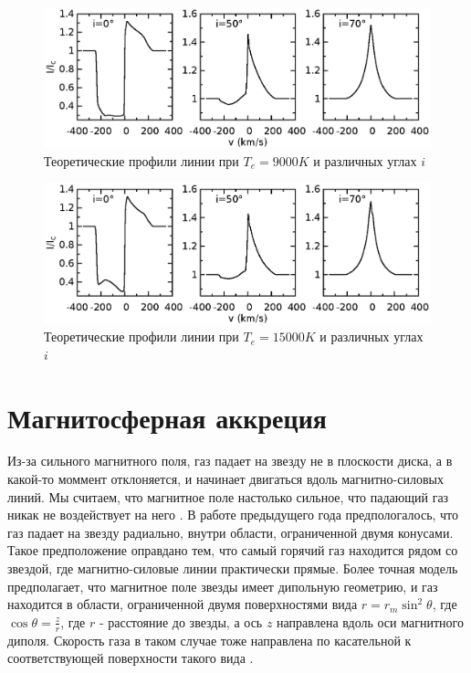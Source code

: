 \documentclass{article}
\begin{document}
\begin{figure} [h]
    \centering
    \includegraphics[width=1\textwidth]{prof}
    \caption{Теоретические профили линии при $T_e=9000K$ и различных углах $i$}
\end{figure}

\begin{figure} [h]
    \centering
    \includegraphics[width=1\textwidth]{prof1}
    \caption{Теоретические профили линии при $T_e=15000K$ и различных углах $i$}
\end{figure}

\section{Магнитосферная аккреция}

Из-за сильного магнитного поля, газ падает на звезду не в плоскости диска, а в какой-то моммент отклоняется, и начинает двигаться вдоль магнитно-силовых линий. Мы считаем, что магнитное поле настолько сильное, что падающий газ никак не воздействует на него \cite{hartman94}. В работе предыдущего года предпологалось, что газ падает на звезду радиально, внутри области, ограниченной двумя конусами. Такое предположение оправдано тем, что самый горячий газ находится рядом со звездой, где магнитно-силовые линии практически прямые. Более точная модель предполагает, что магнитное поле звезды имеет дипольную геометрию, и газ находится в области, ограниченной двумя поверхностями вида $r = r_m\sin^2\theta$, где $\cos \theta = \frac{z}{r}$, где $r$ - расстояние до звезды, а ось $z$ направлена вдоль оси магнитного диполя. Скорость газа в таком случае тоже направлена по касательной к соответствующей поверхности такого вида \cite{hartman94}.
\end{document}
